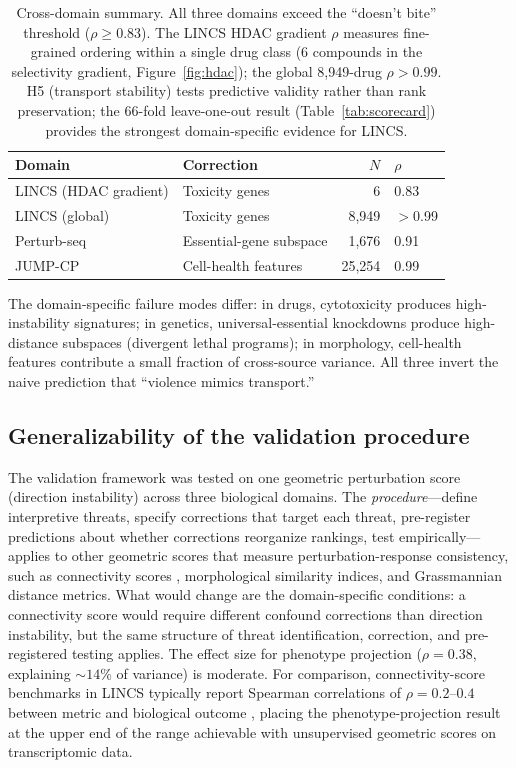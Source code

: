 \documentclass[11pt]{article}
\begin{document}
\begin{table}[t]
\centering
\caption{Cross-domain summary. All three domains exceed the ``doesn't
bite'' threshold ($\rho \geq 0.83$). The LINCS HDAC gradient $\rho$
measures fine-grained ordering within a single drug class (6 compounds
in the selectivity gradient, Figure~\ref{fig:hdac});
the global 8{,}949-drug $\rho > 0.99$. H5 (transport stability) tests
predictive validity rather than rank preservation; the 66-fold
leave-one-out result (Table~\ref{tab:scorecard}) provides the strongest
domain-specific evidence for LINCS.}
\label{tab:cross_domain}
\small
\begin{tabular}{llrl}
\toprule
Domain & Correction & $N$ & $\rho$ \\
\midrule
LINCS (HDAC gradient) & Toxicity genes & 6 & 0.83 \\
LINCS (global) & Toxicity genes & 8{,}949 & $>$0.99 \\
Perturb-seq & Essential-gene subspace & 1{,}676 & 0.91 \\
JUMP-CP & Cell-health features & 25{,}254 & 0.99 \\
\bottomrule
\end{tabular}
\end{table}

The domain-specific failure modes differ: in drugs, cytotoxicity
produces high-instability signatures; in genetics, universal-essential
knockdowns produce high-distance subspaces (divergent lethal programs);
in morphology, cell-health features contribute a small fraction of
cross-source variance. All three invert the naive prediction that
``violence mimics transport.''

\subsection{Generalizability of the validation procedure}

The validation framework was tested on one geometric perturbation score
(direction instability) across three biological domains. The
\emph{procedure}---define interpretive threats, specify corrections
that target each threat, pre-register predictions about whether
corrections reorganize rankings, test empirically---applies to other
geometric scores that measure perturbation-response consistency, such as
connectivity scores \citep{subramanian2017next}, morphological similarity
indices, and Grassmannian distance metrics. What would change are the
domain-specific conditions: a connectivity score would require different
confound corrections than direction instability, but the same
structure of threat identification, correction, and pre-registered
testing applies. The effect size for phenotype projection ($\rho = 0.38$,
explaining ${\sim}14\%$ of variance) is moderate. For comparison,
connectivity-score benchmarks in LINCS typically report Spearman
correlations of $\rho = 0.2$--$0.4$ between metric and biological
outcome \citep{li2020comprehensive}, placing the phenotype-projection
result at the upper end of the range achievable with unsupervised
geometric scores on transcriptomic data.
\end{document}

